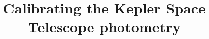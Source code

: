 \documentclass{aastex63}
\begin{document}
\title{Calibrating the Kepler Space Telescope photometry}


\end{document}
